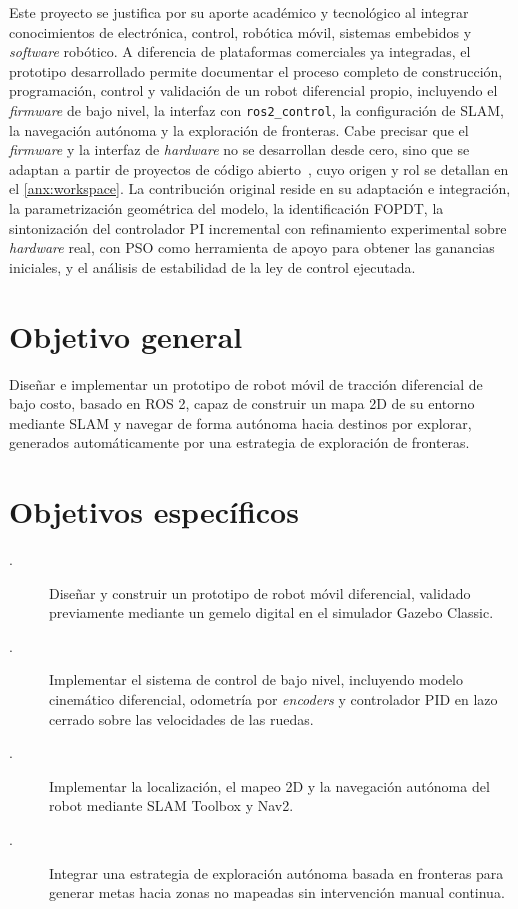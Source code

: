 Este proyecto se justifica por su aporte académico y tecnológico al integrar conocimientos de electrónica, control, robótica móvil, sistemas embebidos y \textit{software} robótico. A diferencia de plataformas comerciales ya integradas, el prototipo desarrollado permite documentar el proceso completo de construcción, programación, control y validación de un robot diferencial propio, incluyendo el \textit{firmware} de bajo nivel, la interfaz con \texttt{ros2\_control}, la configuración de SLAM, la navegación autónoma y la exploración de fronteras. Cabe precisar que el \textit{firmware} y la interfaz de \textit{hardware} no se desarrollan desde cero, sino que se adaptan a partir de proyectos de código abierto~\citep{newans_articubot,newans_diffdrive,hbrobotics_rosarduinobridge}, cuyo origen y rol se detallan en el \ref{anx:workspace}. La contribución original reside en su adaptación e integración, la parametrización geométrica del modelo, la identificación FOPDT, la sintonización del controlador PI incremental con refinamiento experimental sobre \textit{hardware} real, con PSO como herramienta de apoyo para obtener las ganancias iniciales, y el análisis de estabilidad de la ley de control ejecutada.

\section*{Objetivo general}
{}

Diseñar e implementar un prototipo de robot móvil de tracción diferencial de
bajo costo, basado en ROS 2, capaz de construir un mapa 2D de su entorno
mediante SLAM y navegar de forma autónoma hacia destinos por explorar,
generados automáticamente por una estrategia de exploración de fronteras.

\section*{Objetivos específicos}
{}

\begin{description}
\item[\ObEsp.\label{oe1}] Diseñar y construir un prototipo de robot móvil diferencial, validado previamente mediante un gemelo digital en el simulador Gazebo Classic.

\item[\ObEsp.\label{oe2}] Implementar el sistema de control de bajo nivel, incluyendo modelo cinemático diferencial, odometría por \textit{encoders} y controlador PID en lazo cerrado sobre las velocidades de las ruedas.

\item[\ObEsp.\label{oe3}] Implementar la localización, el mapeo 2D y la navegación autónoma del robot mediante SLAM Toolbox y Nav2.

\item[\ObEsp.\label{oe4}] Integrar una estrategia de exploración autónoma basada en fronteras para generar metas hacia zonas no mapeadas sin intervención manual continua.

\end{description}

